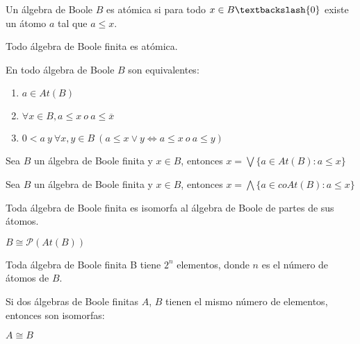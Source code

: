 \begin{ndef}
    Un álgebra de Boole $B$ es atómica si para todo $x \in B \textbackslash \{0\}$ existe un átomo $a$ tal que $a \leq x$.
\end{ndef}
\begin{nth}
    Todo álgebra de Boole finita es atómica.
\end{nth}
\begin{nth}
    En todo álgebra de Boole $B$ son equivalentes:
    \begin{enumerate}
        \item $a \in At(B)$
        \item $\forall x \in B, a \leq x \ o \ a \leq \overline{x}$
        \item $0 < a \ y \ \forall x,y \in B \ (a \leq x \lor y \Leftrightarrow a \leq x \ o \ a \leq y)$
    \end{enumerate}
\end{nth}
\begin{nth}
    Sea $B$ un álgebra de Boole finita  y $x \in B$, entonces $x = \bigvee \{a \in At(B): a \leq x\}$
\end{nth}
\begin{nth}
    Sea $B$ un álgebra de Boole finita  y $x \in B$, entonces $x = \bigwedge \{a \in coAt(B): a \leq x\}$
\end{nth}

\begin{ncor}
    Toda álgebra de Boole finita es isomorfa al álgebra de Boole de partes de sus átomos.
    \begin{center} $B \cong \mathcal{P} (At(B))$ \end{center}
\end{ncor}

\begin{ncor}
    Toda  álgebra de Boole finita B tiene $2^n$ elementos, donde $n$ es el número de átomos de $B$.
\end{ncor}

\begin{nth}
    Si dos álgebras de Boole finitas $A$, $B$ tienen el mismo número de elementos, entonces son isomorfas:
    \begin{center}
        $A \cong B$
    \end{center}
\end{nth}

